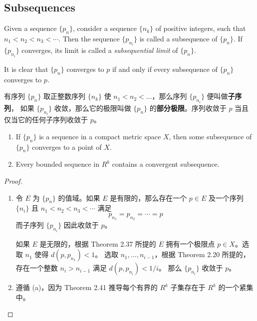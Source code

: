 \documentclass[../poma-notes.tex]{subfiles}
\begin{document}
\subsection*{Subsequences}

\begin{definition}
  Given a sequence $\{p_n\}$, consider a sequence $\{n_k\}$ of positive integers, such that $n_1 < n_2 < n_3 < \cdots$.
  Then the sequence $\{p_{n_i}\}$ is called a subsequence of $\{p_n\}$. If $\{p_{n_i}\}$ converges, its limit is called
  a \textit{subsequential limit} of $\{p_n\}$.

  It is clear that $\{p_n\}$ converges to $p$ if and only if every subsequence of $\{p_n\}$ converges to $p$.
\end{definition}

\anote 有序列 $\{p_n\}$ 取正整数序列 $\{n_k\}$ 使 $n_1 < n_2 < \dots$，那么序列 $\{p_{n_i}\}$ 便叫做\textbf{子序列}，
如果 $\{p_{n_i}\}$ 收敛，那么它的极限叫做 $\{p_n\}$ 的\textbf{部分极限}。序列收敛于 $p$ 当且仅当它的任何子序列收敛于 $p$。

\begin{theorem}
  \begin{enumerate}[label=(\alph*)]
    \item If $\{p_n\}$ is a sequence in a compact metric space $X$, then some subsequence of $\{p_n\}$ converges to a
          point of $X$.
    \item Every bounded sequence in $R^k$ contains a convergent subsequence.
  \end{enumerate}
\end{theorem}

\begin{proof}
  \begin{enumerate}[label=(\alph*)]
    \item 令 $E$ 为 $\{p_n\}$ 的值域。如果 $E$ 是有限的，那么存在一个 $p\in E$ 及一个序列 $\{n_i\}$ 且 $n_1<n_2<n_3<\cdots$
          满足
          \[ p_{n_1} = p_{n_2} = \cdots = p \]
          而子序列 $\{p_{n_i}\}$ 因此收敛于 $p$。

          如果 $E$ 是无限的，根据 Theorem 2.37 所提的 $E$ 拥有一个极限点 $p \in X$。选取 $n_1$ 使得 $d(p,p_{n_1}) < 1$。
          选取 $n_1, \dots, n_{i-1}$，根据 Theorem 2.20 所提的，存在一个整数 $n_i > n_{i-1}$ 满足 $d(p, p_{n_i}) < 1/i$。
          那么 $\{p_{n_i}\}$ 收敛于 $p$。
    \item 遵循 (a)，因为 Theorem 2.41 推导每个有界的 $R^k$ 子集存在于 $R^k$ 的一个紧集中。
  \end{enumerate}
\end{proof}
\end{document}
